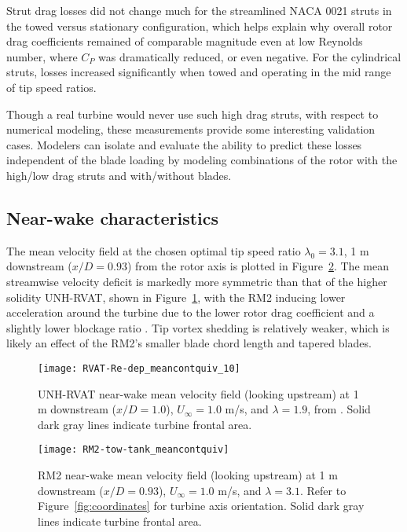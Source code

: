 Strut drag losses did not change much for the streamlined NACA 0021 struts in
the towed versus stationary configuration, which helps explain why overall rotor
drag coefficients remained of comparable magnitude even at low Reynolds number,
where $C_P$ was dramatically reduced, or even negative. For the cylindrical
struts, losses increased significantly when towed and operating in the mid range
of tip speed ratios.

Though a real turbine would never use such high drag struts, with respect to
numerical modeling, these measurements provide some interesting validation
cases. Modelers can isolate and evaluate the ability to predict these losses
independent of the blade loading by modeling combinations of the rotor with the
high/low drag struts and with/without blades.


\subsection{Near-wake characteristics}

The mean velocity field at the chosen optimal tip speed ratio $\lambda_0=3.1$, 1
m downstream ($x/D=0.93$) from the rotor axis is plotted in
Figure~\ref{fig:meancontquiv}. The mean streamwise velocity deficit is markedly
more symmetric than that of the higher solidity UNH-RVAT, shown in
Figure~\ref{fig:rvat-meancontquiv}, with the RM2 inducing lower acceleration
around the turbine due to the lower rotor drag coefficient and a slightly lower
blockage ratio \cite{Bachant2015-JoT}. Tip vortex shedding is relatively weaker,
which is likely an effect of the RM2's smaller blade chord length and tapered
blades.

\begin{figure}
    \texttt{[image: RVAT-Re-dep\_meancontquiv\_10]}
    
    \caption{UNH-RVAT near-wake mean velocity field (looking upstream) at 1 m
        downstream ($x/D=1.0$), $U_\infty=1.0$ m/s, and $\lambda=1.9$, from
        \cite{Bachant2016-Energies}. Solid dark gray lines indicate turbine frontal
        area.}
    
    \label{fig:rvat-meancontquiv}
\end{figure}

\begin{figure}
    \texttt{[image: RM2-tow-tank\_meancontquiv]}
    
    \caption{RM2 near-wake mean velocity field (looking upstream) at 1 m
        downstream ($x/D=0.93$), $U_\infty=1.0$ m/s, and $\lambda=3.1$. Refer to
        Figure~\ref{fig:coordinates} for turbine axis orientation. Solid dark gray
        lines indicate turbine frontal area.}
    
    \label{fig:meancontquiv}
\end{figure}

